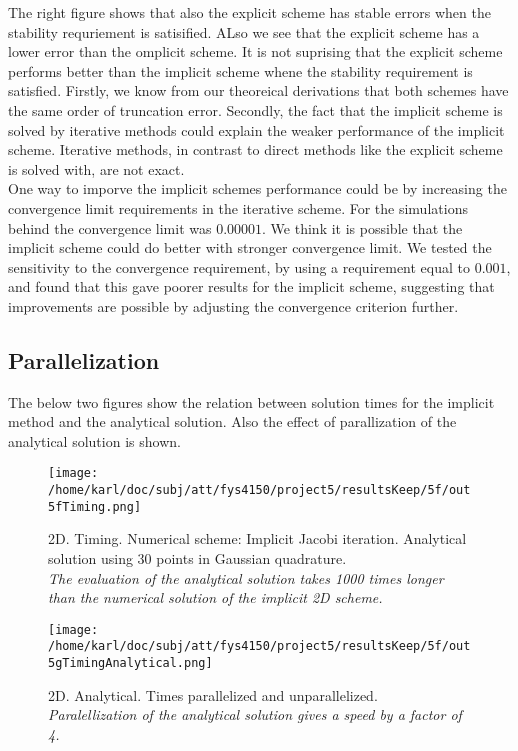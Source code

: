 \documentclass{article}
\begin{document}
The right figure shows that also the explicit scheme has stable errors when the stability requriement is satisified. ALso we see that the explicit scheme has a lower error than the omplicit scheme. It is not suprising that the explicit scheme performs better than the implicit scheme whene the stability requirement is satisfied. Firstly, we know from our theoreical derivations that both schemes have the same order of truncation error. Secondly, the fact that the implicit scheme is solved by iterative methods could explain the weaker performance of the implicit scheme. Iterative methods, in contrast to direct methods like the explicit scheme is solved with, are not exact.\\ 

One way to imporve the implicit schemes performance could be by increasing the convergence limit requirements in the iterative scheme. For the simulations behind the convergence limit was $0.00001$. We think it is possible that the implicit scheme could do better with stronger convergence limit. We tested the sensitivity to the convergence requirement, by using a requirement equal to $0.001$, and found that this gave poorer results for the implicit scheme, suggesting that improvements are possible by adjusting the convergence criterion further.

\subsection{Parallelization}
The below two figures show the relation between solution times for the implicit method and the analytical solution. Also the effect of parallization of the analytical solution is shown.

\begin{minipage}{.45\textwidth} 
	\begin{figure}[H]
		\centering
		\texttt{[image: /home/karl/doc/subj/att/fys4150/project5/resultsKeep/5f/out5fTiming.png]}
		\caption{2D. Timing. Numerical scheme: Implicit Jacobi iteration. Analytical solution using 30 points in Gaussian quadrature. \\ \textit{The evaluation of the analytical solution takes 1000 times longer than the numerical solution of the implicit 2D scheme.}}
		\label{fig:figParallel1}
	\end{figure}
\end{minipage}\hfill
\begin{minipage}{.45\textwidth} 
	\begin{figure}[H]
		\centering
		\texttt{[image: /home/karl/doc/subj/att/fys4150/project5/resultsKeep/5f/out5gTimingAnalytical.png]}
		\caption{2D. Analytical. Times parallelized and unparallelized.\\ \textit{Paralellization of the analytical solution gives a speed by a factor of 4.}}
		\label{fig:figParalell2}
	\end{figure}
\end{minipage}\hfill
\vspace{2ex}
\end{document}
